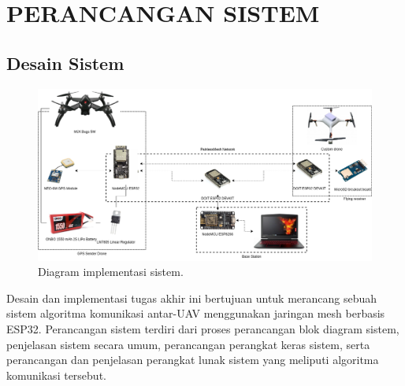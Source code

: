 \chapter{PERANCANGAN SISTEM}

\section{Desain Sistem}
\begin{figure}[H]
	\centering
	\includegraphics[scale=0.35]{./assets/DiagramHWNewV2}
	\caption{Diagram implementasi sistem.}
\end{figure}
Desain dan implementasi tugas akhir ini bertujuan untuk merancang sebuah sistem algoritma komunikasi antar-UAV menggunakan jaringan mesh berbasis ESP32. Perancangan sistem terdiri dari proses perancangan blok diagram sistem, penjelasan sistem secara umum, perancangan perangkat keras sistem, serta perancangan dan penjelasan perangkat lunak sistem yang meliputi algoritma komunikasi tersebut.

